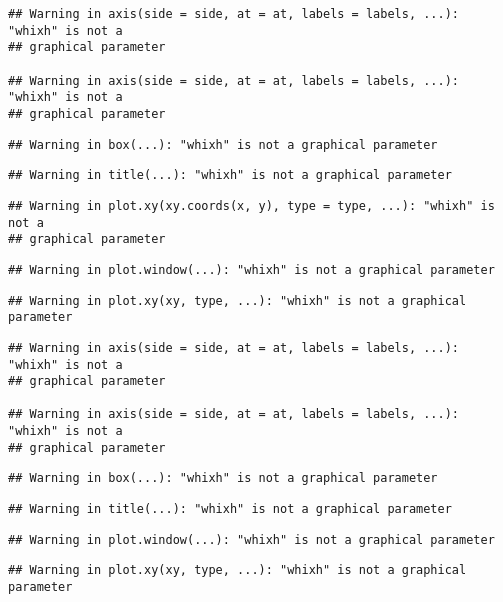 \documentclass[
]{article}
\begin{document}
\begin{verbatim}
## Warning in axis(side = side, at = at, labels = labels, ...): "whixh" is not a
## graphical parameter

## Warning in axis(side = side, at = at, labels = labels, ...): "whixh" is not a
## graphical parameter
\end{verbatim}

\begin{verbatim}
## Warning in box(...): "whixh" is not a graphical parameter
\end{verbatim}

\begin{verbatim}
## Warning in title(...): "whixh" is not a graphical parameter
\end{verbatim}

\begin{verbatim}
## Warning in plot.xy(xy.coords(x, y), type = type, ...): "whixh" is not a
## graphical parameter
\end{verbatim}

\begin{verbatim}
## Warning in plot.window(...): "whixh" is not a graphical parameter
\end{verbatim}

\begin{verbatim}
## Warning in plot.xy(xy, type, ...): "whixh" is not a graphical parameter
\end{verbatim}

\begin{verbatim}
## Warning in axis(side = side, at = at, labels = labels, ...): "whixh" is not a
## graphical parameter

## Warning in axis(side = side, at = at, labels = labels, ...): "whixh" is not a
## graphical parameter
\end{verbatim}

\begin{verbatim}
## Warning in box(...): "whixh" is not a graphical parameter
\end{verbatim}

\begin{verbatim}
## Warning in title(...): "whixh" is not a graphical parameter
\end{verbatim}

\begin{verbatim}
## Warning in plot.window(...): "whixh" is not a graphical parameter
\end{verbatim}

\begin{verbatim}
## Warning in plot.xy(xy, type, ...): "whixh" is not a graphical parameter
\end{verbatim}
\end{document}
